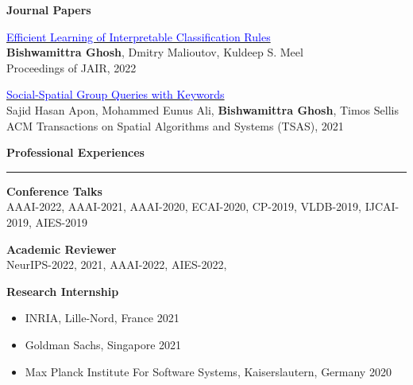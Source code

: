 \documentclass[a4paper,10pt,final]{article}
\newcommand{\Sep}{\vspace{1.5em}}
\newcommand{\SmallSep}{\vspace{0.5em}}
\newcommand{\blue}[1]{\textcolor{blue}{#1}}
\begin{document}
\clearpage
\large { \textbf{Journal Papers}}
\normalsize

\SmallSep

	\begin{etaremune}
		\item \href{https://arxiv.org/pdf/2205.06936.pdf}{\blue{Efficient Learning of Interpretable Classification Rules}} \\
		\textbf{Bishwamittra Ghosh}, Dmitry Malioutov, Kuldeep S. Meel\\
		Proceedings of JAIR, 2022
		
		
		\item 	\href{https://dl.acm.org/doi/full/10.1145/3475962?accessTab=true}{\blue{Social-Spatial Group Queries with Keywords}}\\
		Sajid Hasan Apon, Mohammed Eunus Ali, \textbf{Bishwamittra Ghosh}, Timos Sellis\\
		ACM Transactions on Spatial Algorithms and Systems (TSAS), 2021
		
	\end{etaremune}

%

\Sep
\Large { \textbf{Professional Experiences}}\\
\noindent\rule{\textwidth}{1pt}
\normalsize
\textbf{Conference Talks}\\
AAAI-2022, AAAI-2021, AAAI-2020, ECAI-2020, CP-2019, VLDB-2019, IJCAI-2019, AIES-2019

\SmallSep
\textbf{Academic Reviewer}\\
NeurIPS-2022, 2021, AAAI-2022,  AIES-2022, 

\SmallSep
\textbf{Research Internship}
\begin{itemize}
	\item INRIA, Lille-Nord, France \hspace*{\fill}2021
	\item Goldman Sachs, Singapore \hspace*{\fill}2021
	\item  Max Planck Institute For Software Systems, Kaiserslautern, Germany \hspace*{\fill}2020
\end{itemize}
\end{document}
